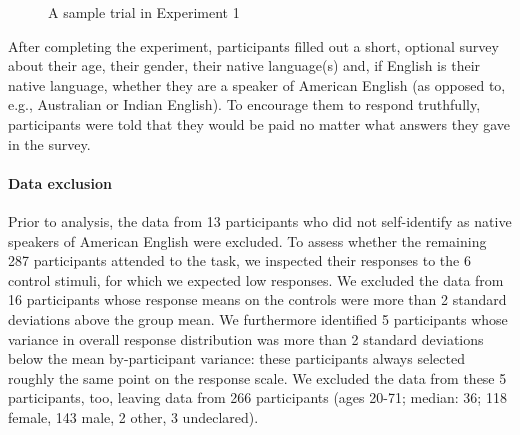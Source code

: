 \documentclass[11pt,fleqn]{article}
\newcommand{\6}{\mbox{$[\hspace*{-.6mm}[$}}
\newcommand{\9}{\mbox{$]\hspace*{-.6mm}]$}}
\begin{document}
\begin{figure}[h!]
\begin{center}
\end{center}
\caption{A sample trial in Experiment 1}\label{fig-trial-exp1}
\end{figure}

After completing the experiment, participants filled out a short, optional survey about their age, their gender, their native language(s) and, if English is their native language, whether they are a speaker of American English (as opposed to, e.g., Australian or Indian English). To encourage them to respond truthfully, participants were told that they would be paid no matter what answers they gave in the survey.

\paragraph{Data exclusion}
Prior to analysis, the data from 13 participants who did not self-identify as native speakers of American English were excluded. To assess whether the remaining 287 participants attended to the task, we inspected their responses to the 6 control stimuli, for which we expected low responses. We excluded the data from 16 participants whose response means on the controls were more than 2 standard deviations above the group mean. We furthermore identified 5 participants whose variance in overall response distribution was more than 2 standard deviations below the mean by-participant variance: these participants always selected roughly the same point on the response scale. We excluded the data from these 5 participants, too, leaving data from 266 participants (ages 20-71; median: 36; 118 female, 143 male, 2 other, 3 undeclared).
\end{document}
